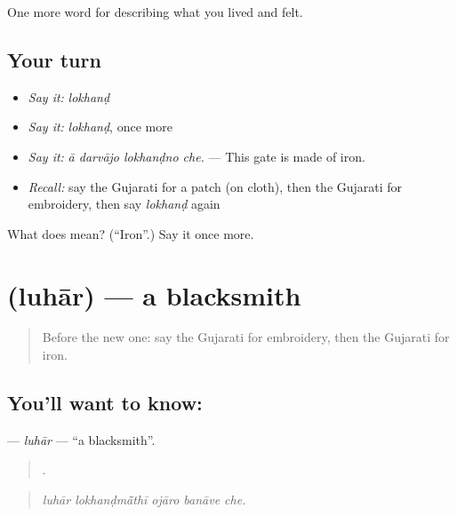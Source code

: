 \begin{grammarlens}[title={What you've built}]
One more word for describing what you lived and felt.
\end{grammarlens}

\subsection*{Your turn}
\begin{itemize}
\raggedright
  \item \emph{Say it:} \emph{lokhanḍ}
  \item \emph{Say it:} \emph{lokhanḍ}, once more
  \item \emph{Say it:} \emph{ā darvājo lokhanḍno che.} — This gate is made of iron.
  \item \emph{Recall:} say the Gujarati for a patch (on cloth), then the Gujarati for embroidery, then say \emph{lokhanḍ} again
\end{itemize}

\begin{tcolorbox}[breakable,colback=teal!4,colframe=teal!35!black,title={Before you move on}]
What does  mean? (\textquotedblleft{}Iron\textquotedblright{}.) Say it once more.
\end{tcolorbox}
\section[\texorpdfstring{\gu{લુહાર} (luhār)}{લુહાર (luhār)}]{ (luhār) — a blacksmith}

\label{lesson:GU-C508-luhar}



\begin{quote}
Before the new one: say the Gujarati for embroidery, then the Gujarati for iron.
\end{quote}

\subsection*{You'll want to know: }
\textbf{} — \emph{luhār} — \textquotedblleft{}a blacksmith\textquotedblright{}.

\begin{quote}
    .
\end{quote}

\begin{quote}
\emph{luhār lokhanḍmā̃thī ojāro banāve che.}
\end{quote}

